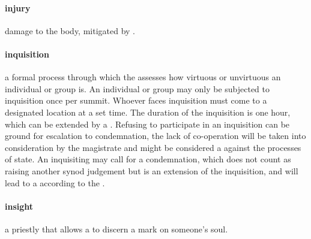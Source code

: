 \paragraph{injury} damage to the body, mitigated by .
\paragraph{inquisition} a formal process through which the  assesses how virtuous or unvirtuous an individual or group is. An individual or group may only be subjected to inquisition once per summit. Whoever faces inquisition must come to a designated location at a set time. The duration of the inquisition is one hour, which can be extended by a . Refusing to participate in an inquisition can be ground for escalation to condemnation, the lack of co-operation will be taken into consideration by the magistrate and might be considered a  against the processes of state. An inquisiting  may call for a condemnation, which does not count as raising another synod judgement but is an extension of the inquisition, and will lead to a  according to the .
\paragraph{insight} a priestly  that allows a  to discern a mark on someone's soul.
